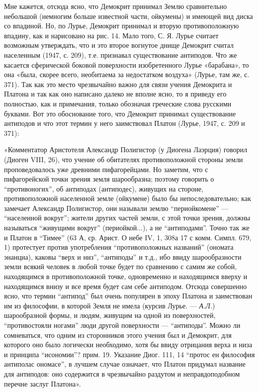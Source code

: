 Мне  кажется, отсюда  ясно, что  Демокрит принимал  Землю сравнительно
небольшой  (немногим  больше  известной  части,  ойкумены)  и  имеющей
вид  диска со  впадиной.  Но,  по Лурье,  Демокрит  принимал и  вторую
противоположную  впадину, как  и  нарисовано на  рис.  14. Мало  того,
С.  Я.   Лурье  считает  возможным   утверждать,  что  и   это  второе
вогнутое  днище  Демокрит  считал  населенным  (1947,  с.  209),  т.е.
признавал существование антиподов. Что же касается сферической боковой
поверхности  изобретенного  Лурье  «барабана», то  она  «была,  скорее
всего, необитаема за недостатком воздуха» (Лурье, там же, с. 371). Так
как это место чрезвычайно важно для связи учения Демокрита и Платона и
так  как  оно  написано  далеко  не вполне  ясно,  то  я  приведу  его
полностью, как и примечания, только обозначая греческие слова русскими
буквами. Вот это обоснование того, что Демокрит принимал существование
антиподов и что этот термин у него заимствовал Платон (Лурье, 1947, с.
209 и 371):

«Комментатор  Аристотеля  Александр  Полигистор  (у  Диогена  Лаэрция)
говорил (Диоген  VIII, 26),  что учение об  обитателях противоположной
стороны земли проповедовалось уже  древними пифагорейцами. Но заметим,
что с  пифагорейской точки зрения земля  шарообразна; поэтому говорить
о  ``противоногих'', об  антиподах  (антиподес),  живущих на  стороне,
противоположной населенной земле (ойкумене) было бы непоследовательно;
как замечает Александр Полигистор, они называли землю ``периойкомене''
--- ``населенной  вокруг''; жители других  частей земли, с  этой точки
зрения,  должны называться  ``живущими вокруг''  (периойкой...), а  не
``антиподами''.  Точно  так  же  и  Платон  в  ``Тимее''  (63  А,  ср.
Арист.  О небе  IV,  1, 308а  17  с комм.  Симпл.  679, 1)  протестует
против  употребления ``противоположных  названий'' (ономата  энанциа),
каковы ``верх и  низ'', ``антиподы'' и т.д.,  ибо ввиду шарообразности
земли  всякий человек  в любой  точке будет  по сравнению  с самим  же
собой, находящимся в противоположной точке, одновременно и находящимся
вверху  и находящимся  внизу и  все  время будет  сам себе  антиподом.
Отсюда совершенно ясно,  что термин ``антипод'' был  очень популярен в
эпоху  Платона и  заимствован  им  из философии,  в  которой Земля  не
имела  (курсив Лурье.  --- \emph{А.Л.})  шарообразной формы,  и людям,
живущим на одной из поверхностей, ``противостояли ногами'' люди другой
поверхности  ---  ``антиподы''. Можно  ли  сомневаться,  что одним  из
сторонников  этого  учения  был  и Демокрит,  для  которого  оно  было
логически необходимо, хотя бы ввиду  отрицания верха и низа и принципа
``исономии''? прим. 19.  Указание Диог. 111, 14  ``протос ен философия
антиполас  ономасе'', в  лучшем случае  означает, что  Платон придумал
название  для  антиподов:  оно  содержится в  чрезвычайно  раздутом  и
неправдоподобном перечне заслуг Платона».


